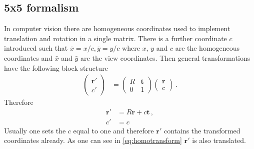 \documentclass[12pt,a4paper,twoside,openright,BCOR10mm,headsepline,titlepage,abstracton,chapterprefix,final]{scrreprt}
\newcommand\Vector[1]{{\mathbf{#1}}}
\begin{document}
\subsection{5x5 formalism}
In computer vision there are homogeneous coordinates used to implement translation and rotation in a single matrix.
There is a further coordinate $c$ introduced such that $\bar{x} = x/c, \bar{y} = y/c$ where $x$, $y$ and $c$
are the homogeneous coordinates and $\bar{x}$ and $\bar{y}$ are the view coordinates. Then general transformations have the following block
structure
\begin{align}
 \begin{pmatrix} \Vector{r}' \\ c' \end{pmatrix} &= 
 \begin{pmatrix}
  R & \Vector{t} \\
  0 & 1
 \end{pmatrix}
 \begin{pmatrix}
  \Vector{r} \\ 
  c
 \end{pmatrix}\,.
\end{align}
Therefore
\begin{align}
 \Vector{r}' &= R \Vector{r} + c \Vector{t}\,,\label{eq:homotransform}\\
 c' &= c
\end{align}
Usually one sets the $c$ equal to one and therefore $\Vector{r}'$ contains
the transformed coordinates already. As one can see in \eqref{eq:homotransform}
$\Vector{r}'$ is also translated.
\end{document}
